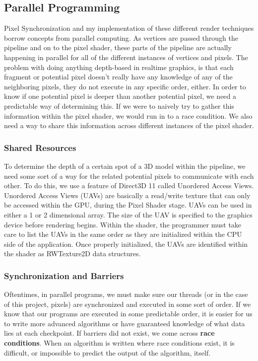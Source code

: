 \documentclass[a4paper, 12pt]{article}
\begin{document}
\subsection{Parallel Programming}

Pixel Synchronization and my implementation of these different render
techniques borrow concepts from parallel computing. As vertices are passed
through the pipeline and on to the pixel shader, these parts of the pipeline
are actually happening in parallel for all of the different instances of
vertices and pixels. The problem with doing anything depth-based in realtime
graphics, is that each fragment or potential pixel doesn't really have any
knowledge of any of the neighboring pixels, they do not execute in any
specific order, either. In order to know if one potential pixel is deeper than
another potential pixel, we need a predictable way of determining this. If we
were to naively try to gather this information within the pixel shader, we
would run in to a race condition. We also need a way to share this information
across different instances of the pixel shader.

\subsubsection{Shared Resources}

To determine the depth of a certain spot of a 3D model within the pipeline, we
need some sort of a way for the related potential pixels to communicate with
each other. To do this, we use a feature of Direct3D 11 called Unordered
Access Views. Unordered Access Views (UAVs) are basically a read/write texture
that can only be accessed within the GPU, during the Pixel Shader stage. UAVs
can be used in either a 1 or 2 dimensional array. The size of the UAV is
specified to the graphics device before rendering begins. Within the shader,
the programmer must take care to list the UAVs in the same order as they are
initialized within the CPU side of the application. Once properly initialized,
the UAVs are identified within the shader as RWTexture2D data structures.

\subsubsection{Synchronization and Barriers}

Oftentimes, in parallel programs, we must make sure our threads (or in the
case of this project, pixels) are synchronized and executed in some sort of
order. If we know that our programs are executed in some predictable order, it
is easier for us to write more advanced algorithms or have guaranteed
knowledge of what data lies at each checkpoint. If barriers did not exist, we
come across \textbf{race conditions}. When an algorithm is written where race
conditions exist, it is difficult, or impossible to predict the output of the
algorithm, itself.
\end{document}
